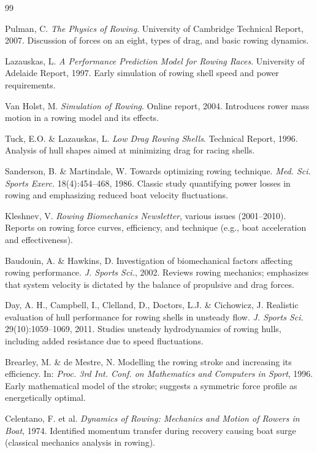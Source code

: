 \documentclass[12pt]{article}
\begin{document}
\begin{thebibliography}{99}

Pulman, C. \textit{The Physics of Rowing}. University of Cambridge Technical Report, 2007.
Discussion of forces on an eight, types of drag, and basic rowing dynamics.

Lazauskas, L. \textit{A Performance Prediction Model for Rowing Races}. University of Adelaide Report, 1997.
Early simulation of rowing shell speed and power requirements.

Van Holst, M. \textit{Simulation of Rowing}. Online report, 2004.
Introduces rower mass motion in a rowing model and its effects.

Tuck, E.O. \& Lazauskas, L. \textit{Low Drag Rowing Shells}. Technical Report, 1996.
Analysis of hull shapes aimed at minimizing drag for racing shells.

Sanderson, B. \& Martindale, W. Towards optimizing rowing technique.
\textit{Med. Sci. Sports Exerc.} 18(4):454–468, 1986.
Classic study quantifying power losses in rowing and emphasizing reduced boat velocity fluctuations.

Kleshnev, V. \textit{Rowing Biomechanics Newsletter}, various issues (2001–2010).
Reports on rowing force curves, efficiency, and technique (e.g., boat acceleration and effectiveness).

Baudouin, A. \& Hawkins, D.
Investigation of biomechanical factors affecting rowing performance.
\textit{J. Sports Sci.}, 2002.
Reviews rowing mechanics; emphasizes that system velocity is dictated by the balance of propulsive and drag forces.

Day, A. H., Campbell, I., Clelland, D., Doctors, L.J. \& Cichowicz, J.
Realistic evaluation of hull performance for rowing shells in unsteady flow.
\textit{J. Sports Sci.} 29(10):1059–1069, 2011.
Studies unsteady hydrodynamics of rowing hulls, including added resistance due to speed fluctuations.

Brearley, M. \& de Mestre, N.
Modelling the rowing stroke and increasing its efficiency.
In: \textit{Proc. 3rd Int. Conf. on Mathematics and Computers in Sport}, 1996.
Early mathematical model of the stroke; suggests a symmetric force profile as energetically optimal.

Celentano, F. et al.
\textit{Dynamics of Rowing: Mechanics and Motion of Rowers in Boat}, 1974.
Identified momentum transfer during recovery causing boat surge (classical mechanics analysis in rowing).


\end{thebibliography}
\end{document}
